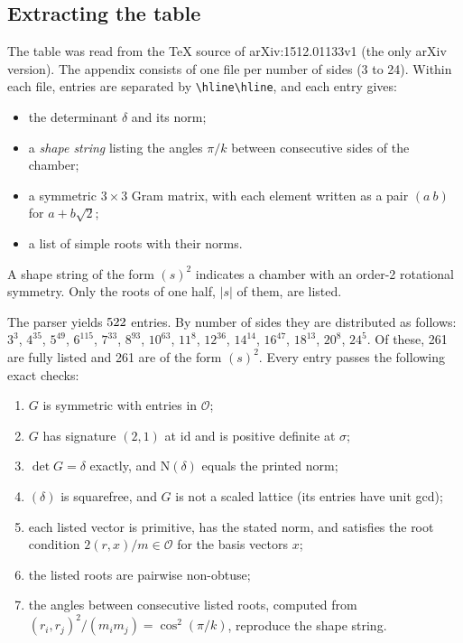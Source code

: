 \documentclass[11pt]{amsart}
\theoremstyle{definition}
\newcommand{\OK}{\mathcal{O}}
\newcommand{\id}{\mathrm{id}}
\newcommand{\N}{\mathrm{N}}
\begin{document}
\subsection{Extracting the table}\label{sec:extract}
The table was read from the \TeX{} source of arXiv:1512.01133v1 (the only arXiv version). The
appendix consists of one file per number of sides (3 to 24). Within each file, entries are
separated by \verb|\hline\hline|, and each entry gives:
\begin{itemize}
\item the determinant $\delta$ and its norm;
\item a \emph{shape string} listing the angles $\pi/k$ between consecutive sides of the chamber;
\item a symmetric $3\times3$ Gram matrix, with each element written as a pair $(a\ b)$ for
  $a+b\sqrt2$;
\item a list of simple roots with their norms.
\end{itemize}
A shape string of the form $(s)^2$ indicates a chamber with an order-2 rotational symmetry.
Only the roots of one half, $|s|$ of them, are listed.

The parser yields $522$ entries. By number of sides they are distributed as follows:
$3^{3}$, $4^{35}$, $5^{49}$, $6^{115}$, $7^{33}$, $8^{93}$, $10^{63}$, $11^{8}$, $12^{36}$,
$14^{14}$, $16^{47}$, $18^{13}$, $20^{8}$, $24^{5}$. Of these, 261 are fully listed and 261
are of the form $(s)^2$. Every entry passes the following exact checks:
\begin{enumerate}
\item $G$ is symmetric with entries in $\OK$;
\item $G$ has signature $(2,1)$ at $\id$ and is positive definite at $\sigma$;
\item $\det G=\delta$ exactly, and $\N(\delta)$ equals the printed norm;
\item $(\delta)$ is squarefree, and $G$ is not a scaled lattice (its entries have unit gcd);
\item each listed vector is primitive, has the stated norm, and satisfies the root condition
  $2(r,x)/m\in\OK$ for the basis vectors $x$;
\item the listed roots are pairwise non-obtuse;
\item the angles between consecutive listed roots, computed from
  $(r_i,r_j)^2/(m_im_j)=\cos^2(\pi/k)$, reproduce the shape string.
\end{enumerate}
\end{document}
